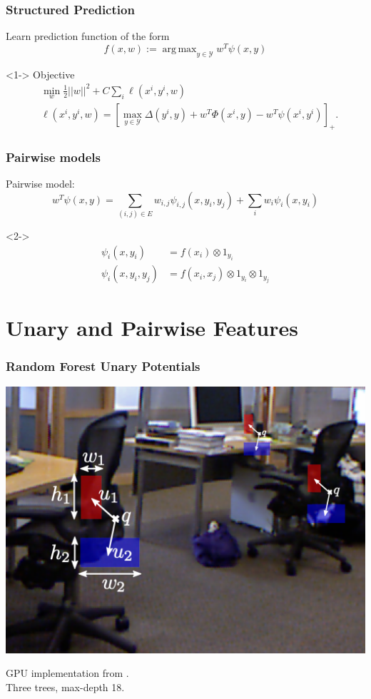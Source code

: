 \documentclass[final,ignorenonframetext,compress]{beamer}
\DeclareMathOperator*{\argmax}{arg\,max}
\newcommand{\hoch}[1]{^{#1}}
\begin{document}
    \begin{frame}
        \frametitle{Structured Prediction}
        Learn prediction function of the form
        \[f(x, w) := \argmax_{y \in \mathcal{Y}}  w^T \psi(x, y) \]
        \begin{visibleenv}<1->
            Objective
            \begin{align}
                &\min_w \frac{1}{2} ||w||^2 + C \sum_i  \ell(x\hoch{i}, y\hoch{i}, w)\\
                &\ell(x\hoch{i}, y\hoch{i}, w) = [\max_{y \in \mathcal{Y}} \Delta(y\hoch{i}, y) + w^T \Phi(x\hoch{i}, y) - w^T \psi(x\hoch{i}, y\hoch{i})]_+.
            \end{align}
        \end{visibleenv}

    \end{frame}

    \begin{frame}
        \frametitle{Pairwise models}
            Pairwise model:
            \[w^T \psi(x, y) = \sum_{(i, j) \in E} w_{i,j} \psi_{i,j}(x, y_i, y_j) + \sum_i w_i \psi_i(x, y_i)\]
        \begin{visibleenv}<2->
            \begin{align*}
                \psi_i(x, y_i) &= f(x_i) \otimes 1_{y_i}\\
                \psi_i(x, y_i, y_j) &= f(x_i, x_j) \otimes 1_{y_i} \otimes 1_{y_j}
            \end{align*}
        \end{visibleenv}
    \end{frame}

    \section{Unary and Pairwise Features}
    \begin{frame}
        \frametitle{Random Forest Unary Potentials}
        \begin{center}
            \includegraphics[width=.6\linewidth]{images/joerg_rf_features}
        \end{center}
        GPU implementation from \citet{stueckler2013}.\\
        Three trees, max-depth 18.
    \end{frame}
\end{document}
